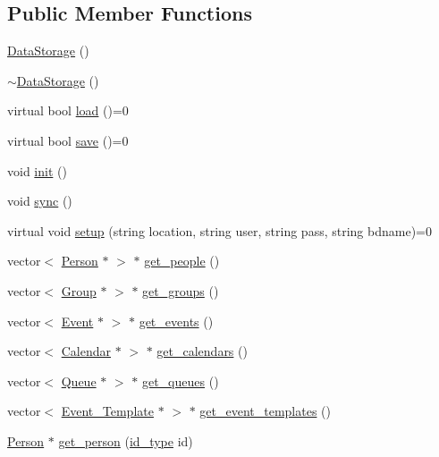 \subsection*{Public Member Functions}
\begin{DoxyCompactItemize}
\item 
\hyperlink{classstorage_1_1DataStorage_a22825d40495dae6a5df46d629fb26a3f}{DataStorage} ()
\item 
\hyperlink{classstorage_1_1DataStorage_adf4ef73e6d368dc7fcd213ba80e1d618}{$\sim$DataStorage} ()
\item 
virtual bool \hyperlink{classstorage_1_1DataStorage_a1cfb8136faea457c36a1adf1d024b2e1}{load} ()=0
\item 
virtual bool \hyperlink{classstorage_1_1DataStorage_a973b7fd5741ad0159d95a67b91734dd2}{save} ()=0
\item 
void \hyperlink{classstorage_1_1DataStorage_a00e2feae10b5a44acf711273c2d0d3d8}{init} ()
\item 
void \hyperlink{classstorage_1_1DataStorage_a6a7b4a651eae72f6c16826632038a59f}{sync} ()
\item 
virtual void \hyperlink{classstorage_1_1DataStorage_aabde44460aae44655dbdf69b8128ad22}{setup} (string location, string user, string pass, string bdname)=0
\item 
vector$<$ \hyperlink{classPerson}{Person} $\ast$ $>$ $\ast$ \hyperlink{classstorage_1_1DataStorage_a6c21f6254e3c57dca63ad39c262b280d}{get\_\-people} ()
\item 
vector$<$ \hyperlink{classGroup}{Group} $\ast$ $>$ $\ast$ \hyperlink{classstorage_1_1DataStorage_a12f909c64f1414e91186c998b6e29db2}{get\_\-groups} ()
\item 
vector$<$ \hyperlink{classEvent}{Event} $\ast$ $>$ $\ast$ \hyperlink{classstorage_1_1DataStorage_a6b649e3fa5ca3eb1921c4ee176a19f42}{get\_\-events} ()
\item 
vector$<$ \hyperlink{classCalendar}{Calendar} $\ast$ $>$ $\ast$ \hyperlink{classstorage_1_1DataStorage_a04a667fec74228c64a60a37510482665}{get\_\-calendars} ()
\item 
vector$<$ \hyperlink{classQueue}{Queue} $\ast$ $>$ $\ast$ \hyperlink{classstorage_1_1DataStorage_a61a1e515f42170324276c5a1a78961c5}{get\_\-queues} ()
\item 
vector$<$ \hyperlink{classEvent__Template}{Event\_\-Template} $\ast$ $>$ $\ast$ \hyperlink{classstorage_1_1DataStorage_a308f8bdd6c6a5ed65586e8c028cc6e42}{get\_\-event\_\-templates} ()
\item 
\hyperlink{classPerson}{Person} $\ast$ \hyperlink{classstorage_1_1DataStorage_abca728c67538176fd721dcb8730bac81}{get\_\-person} (\hyperlink{types_8h_a0b60c08a3ab1435cccc5643d32d8ccee}{id\_\-type} id)

\end{DoxyCompactItemize}
